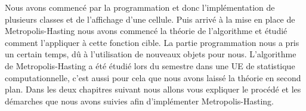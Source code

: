 \begin{article}
    \newline Nous avons commencé par la programmation et donc l'implémentation de plusieurs classes et de l'affichage d'une cellule.
    Puis arrivé à la mise en place de Metropolis-Hasting nous avons commencé la théorie de l'algorithme et étudié comment l'appliquer à cette fonction cible.
    La partie programmation nous a pris un certain temps, dû à l'utilisation de nouveaux objets pour nous.
    L'algorithme de Metropolis-Hasting a été étudié lors du semestre dans une UE de statistique computationnelle, c'est aussi pour cela que nous avons laissé la théorie en second plan.
    Dans les deux chapitres suivant nous allons vous expliquer le procédé et les démarches que nous avons suivies afin d'implémenter Metropolis-Hasting.
\end{article}